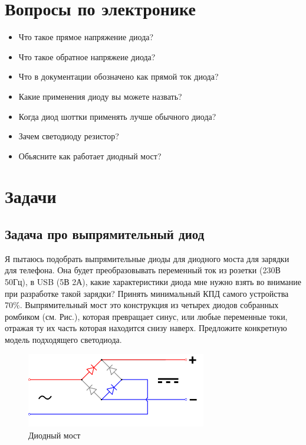\documentclass[a4paper,12pt]{article} %
\begin{document}
\section{Вопросы по электронике}

\begin{itemize}
  \item Что такое прямое напряжение диода?
  \item Что такое обратное напряжеие диода?
  \item Что в документации обозначено как прямой ток диода?
  \item Какие применения диоду вы можете назвать?
  \item Когда диод шоттки применять лучше обычного диода?
  \item Зачем светодиоду резистор?
  \item Обьясните как работает диодный мост?
\end{itemize}

\section{Задачи}
  \subsection{Задача про выпрямительный диод}
Я пытаюсь подобрать выпрямительные диоды для диодного моста для зарядки для телефона. Она будет преобразовывать переменный ток из розетки (230В 50Гц), в USB (5В 2А), какие характеристики диода мне нужно взять во внимание при разработке такой зарядки? Принять минимальный КПД самого устройства 70\%. Выпрямительный мост это конструкция из четырех диодов собранных ромбиком (см. Рис.), которая превращает синус, или любые переменные токи, отражая ту их часть которая находится снизу наверх. Предложите конкретную модель подходящего светодиода.
\begin{figure}[H]
\centering
\includegraphics[width=0.7\textwidth]{bridge.png}
\caption{Диодный мост}
\end{figure}
\end{document}
